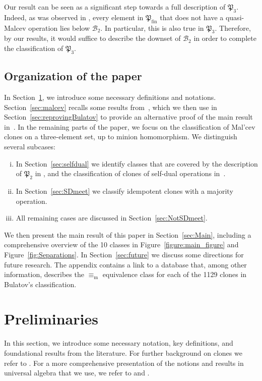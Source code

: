 \documentclass[12pt]{amsart}
\theoremstyle{definition}
\theoremstyle{definition}
\newcommand{\Pfin}{\mathfrak P_{\mathrm{fin}}}
\newcommand{\Pboole}{\mathfrak P_{2}}
\newcommand{\Pthree}{\mathfrak P_{3}}
\newcommand{\minorequivalentto}{\equiv_{\mathrm{m}}}
\begin{document}
Our result can be seen as a significant step towards a full description of $\Pthree$. Indeed, as was observed in \cite[Theorem 2.13]{VucajZhuk}, every element in $\Pfin$ that does not have a quasi-Malcev operation lies below $\mathcal B_2$. In particular, this is also true in $\Pthree$. Therefore, by our results, it would suffice to describe the downset of $\mathcal B_2$ in order to complete the classification of $\Pthree$.


\subsection*{Organization of the paper} In Section~\ref{sec:Preliminaries}, we introduce some necessary definitions and notations. Section~\ref{sec:malcev} recalls some results from~\cite{KS-parallelogramterms}, which we then use in Section~\ref{sec:reprovingBulatov} to provide an alternative proof of the main result in~\cite{BulatovImportante}. In the remaining parts of the paper, we focus on the classification of Mal’cev clones on a three-element set, up to minion homomorphism. We distinguish several subcases:

\begin{enumerate}[(i)]
    \item In Section~\ref{sec:selfdual} we identify classes that are covered by the description of $\Pboole$ in \cite{albert}, and the classification of clones of self-dual operations in~\cite{BodirskyVucajZhuk}. \label{itm:Intro1}
    \item In Section~\ref{sec:SDmeet} we classify idempotent clones with a majority operation. \label{itm:Intro2} \label{itm:Intro3}
    \item All remaining cases are discussed in Section~\ref{sec:NotSDmeet}.\label{itm:Intro4} 
\end{enumerate}
We then present the main result of this paper in Section~\ref{sec:Main}, including a comprehensive overview of the 10 classes in Figure~\ref{figure:main_figure} and Figure~\ref{fig:Separations}. In Section~\ref{sec:future} we discuss some directions for future research. The appendix contains a link to a database that, among other information, describes the $\minorequivalentto$ equivalence class for each of the 1129 clones in Bulatov's classification.

\section{Preliminaries}\label{sec:Preliminaries}
In this section, we introduce some necessary notation, key definitions, and foundational results from the literature. For further background on clones we refer to \cite{PosKal79,Bod21}. For a more comprehensive presentation of the notions and results in universal algebra that we use, we refer to \cite{McKMcnTay88} and \cite{BS}.
\end{document}
